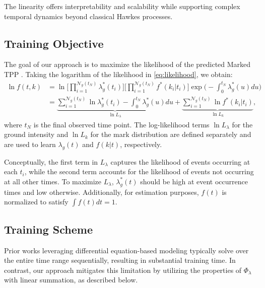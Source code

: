 The linearity offers interpretability and scalability while supporting complex temporal dynamics beyond classical Hawkes processes. 

\subsection{Training Objective \label{sec:obj}}

The goal of our approach is to maximize the likelihood of the predicted Marked TPP \cite{bib:daley}. Taking the logarithm of the likelihood in \eqref{eq:likelihood}, we obtain:
\begin{equation}
\begin{aligned}
\ln f(t, k) &= \ln \bigg[\prod^{\mathcal{N}_g(t_N)}_{i=1} \lambda^*_g(t_i)\bigg] \bigg[\prod^{\mathcal{N}_g(t_N)}_{i=1} f^*(k_i | t_i) \bigg] \exp\bigg(- \int_0^{t_N} \lambda^*_g(u) du \bigg) \\
 &= \underbrace{\sum^{\mathcal{N}_g(t_N)}_{i=1} \ln \lambda^*_g(t_i) - \int_0^{t_N} \lambda^*_g(u) du}_{\ln L_\lambda} + \underbrace{\sum^{\mathcal{N}_g(t_N)}_{i=1} \ln f^*(k_i | t_i)}_{\ln L_k},
\label{eq:obj}
\end{aligned}
\end{equation}
where $t_N$ is the final observed time point. The log-likelihood terms $\ln L_\lambda$ for the ground intensity and $\ln L_k$ for the mark distribution are defined separately and are used to learn $\lambda_g(t)$ and $f(k | t)$, respectively.

Conceptually, the first term in $L_\lambda$ captures the likelihood of events occurring at each $t_i$, while the second term accounts for the likelihood of events not occurring at all other times. To maximize $L_\lambda$, $\lambda^*_g(t)$ should be high at event occurrence times and low otherwise. 
Additionally, for estimation purposes, $f(t)$ is normalized to satisfy $\int f(t) dt = 1$.

\subsection{Training Scheme \label{train_parallel}}
Prior works leveraging differential equation-based modeling \cite{bib:NJSDE, bib:STPP} typically solve over the entire time range sequentially, resulting in substantial training time. In contrast, our approach mitigates this limitation by utilizing the properties of $\Phi_\lambda$ with linear summation, as described below.

